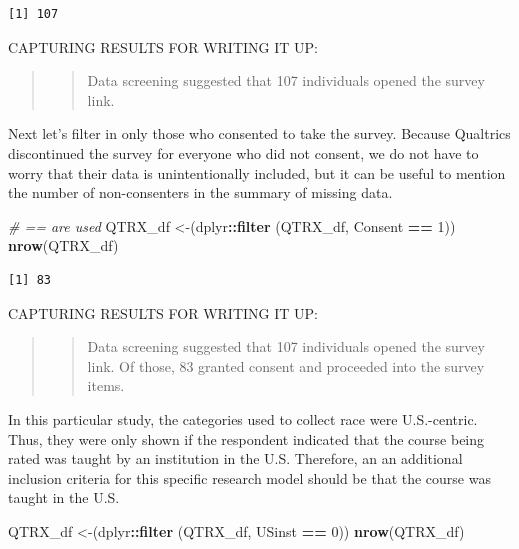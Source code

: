\documentclass[
  11pt,
]{book}
\newenvironment{Shaded}{\begin{snugshade}}{\end{snugshade}}
\newcommand{\CommentTok}[1]{\textcolor[rgb]{0.37,0.37,0.37}{\textit{#1}}}
\newcommand{\DecValTok}[1]{\textcolor[rgb]{0.06,0.06,0.06}{#1}}
\newcommand{\FunctionTok}[1]{\textcolor[rgb]{0.27,0.27,0.27}{\textbf{#1}}}
\newcommand{\NormalTok}[1]{#1}
\newcommand{\OtherTok}[1]{\textcolor[rgb]{0.37,0.37,0.37}{#1}}
\newcommand{\SpecialCharTok}[1]{\textcolor[rgb]{0.43,0.43,0.43}{\textbf{#1}}}
\begin{document}
\begin{verbatim}
[1] 107
\end{verbatim}

CAPTURING RESULTS FOR WRITING IT UP:

\begin{quote}
\begin{quote}
Data screening suggested that 107 individuals opened the survey link.
\end{quote}
\end{quote}

Next let's filter in only those who consented to take the survey. Because Qualtrics discontinued the survey for everyone who did not consent, we do not have to worry that their data is unintentionally included, but it can be useful to mention the number of non-consenters in the summary of missing data.

\begin{Shaded}
\begin{Highlighting}[]
\CommentTok{\# == are used }
\NormalTok{QTRX\_df }\OtherTok{\textless{}{-}}\NormalTok{(dplyr}\SpecialCharTok{::}\FunctionTok{filter}\NormalTok{ (QTRX\_df, Consent }\SpecialCharTok{==} \DecValTok{1}\NormalTok{))}
\FunctionTok{nrow}\NormalTok{(QTRX\_df)}
\end{Highlighting}
\end{Shaded}

\begin{verbatim}
[1] 83
\end{verbatim}

CAPTURING RESULTS FOR WRITING IT UP:

\begin{quote}
\begin{quote}
Data screening suggested that 107 individuals opened the survey link. Of those, 83 granted consent and proceeded into the survey items.
\end{quote}
\end{quote}

In this particular study, the categories used to collect race were U.S.-centric. Thus, they were only shown if the respondent indicated that the course being rated was taught by an institution in the U.S. Therefore, an an additional inclusion criteria for this specific research model should be that the course was taught in the U.S.

\begin{Shaded}
\begin{Highlighting}[]
\NormalTok{QTRX\_df }\OtherTok{\textless{}{-}}\NormalTok{(dplyr}\SpecialCharTok{::}\FunctionTok{filter}\NormalTok{ (QTRX\_df, USinst }\SpecialCharTok{==} \DecValTok{0}\NormalTok{))}
\FunctionTok{nrow}\NormalTok{(QTRX\_df)}
\end{Highlighting}
\end{Shaded}
\end{document}
